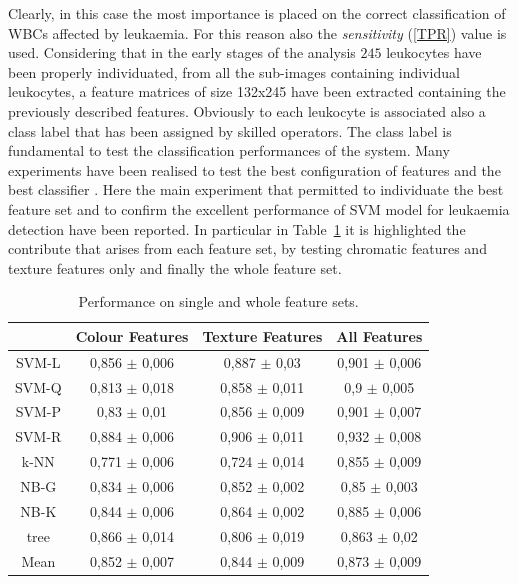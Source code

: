 \documentclass[final,a4paper,12pt,english]{UnicaPhdThesis3}
\begin{document}
Clearly, in this case the most importance is placed on the correct classification of WBCs affected by leukaemia. For this reason also the \textit{sensitivity} (\ref{TPR}) value is used. Considering that in the early stages of the analysis $245$ leukocytes have been properly individuated, from all the sub-images containing individual leukocytes, a feature matrices of size 132x245 have been extracted containing the previously described features. Obviously to each leukocyte is associated also a class label that has been assigned by skilled operators. The class label is fundamental to test the classification performances of the system. Many experiments have been realised to test the best configuration of features and the best classifier \cite{Put13b, Put13c, Put14b}. Here the main experiment that permitted to individuate the best feature set and to confirm the excellent performance of SVM model for leukaemia detection have been reported. In particular in Table~\ref{tab:table3} it is highlighted the contribute that arises from each feature set, by testing chromatic features and texture features only and finally the whole feature set.

\begin{table}[!t]
\centering\tabcolsep=2mm
\begin{tabular}{cccc}
\hline
\hspace{2 mm}	 &   Colour Features 		& Texture Features    			& All Features 			\\
\hline
SVM-L		&  	      	0,856 $\pm$ 0,006						&        	0,887 $\pm$ 0,03            					&        	0,901 $\pm$ 0,006            			\\
SVM-Q	 	&      	0,813 $\pm$  0,018						&       	0,858 $\pm$  0,011 						&       	0,9	 $\pm$  0,005 					\\
SVM-P		&	  	0,83 $\pm$ 0,01							&       	0,856 $\pm$ 0,009 						&       	0,901 $\pm$ 0,007 					\\
SVM-R 		&		0,884 $\pm$ 0,006						&        	0,906 $\pm$ 0,011 	     					&        	0,932 $\pm$ 0,008 	     				\\
k-NN  		& 		0,771 $\pm$ 0,006						&     	0,724 $\pm$ 0,014 						&     	0,855 $\pm$ 0,009 					\\
NB-G  		& 	   	0,834 $\pm$ 0,006						&        	0,852 $\pm$ 0,002 						&        	0,85  $\pm$ 0,003 					\\
NB-K 		& 		0,844 $\pm$ 0,006 						&       	0,864 $\pm$ 0,002 						&       	0,885 $\pm$ 0,006 					\\
tree  		&	    	0,866 $\pm$ 0,014						&        	0,806 $\pm$ 0,019 						&        	0,863 $\pm$ 0,02 					\\
\hline
Mean 	  	 &	  	0,852 $\pm$ 0,007						&        	0,844 $\pm$ 0,009						&        	0,873 $\pm$ 0,009					\\
\hline
\end{tabular}
\caption{Performance on single and whole feature sets.}
\label{tab:table3}
\end{table}
\end{document}

